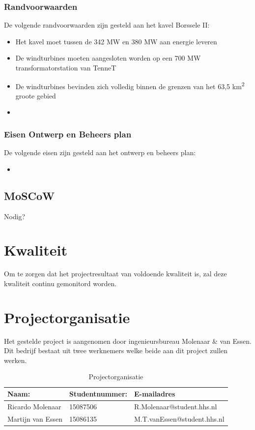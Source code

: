 \documentclass[numbers=endperiod]{scrartcl}
\begin{document}
	\subsubsection{Randvoorwaarden}
	De volgende randvoorwaarden zijn gesteld aan het kavel Borssele II:
	\begin{itemize}[noitemsep]
		\item Het kavel moet tussen de 342 MW en 380 MW aan energie leveren
		\item De windturbines moeten aangesloten worden op een 700 MW transformatorstation van TenneT
		\item De windturbines bevinden zich volledig binnen de grenzen van het 63,5 km\textsuperscript{2} groote gebied
		\item
	\end{itemize}
	\subsubsection{Eisen Ontwerp en Beheers plan}
	De volgende eisen zijn gesteld aan het ontwerp en beheers plan:
	\begin{itemize}
	\item
	\end{itemize}
	\subsection{MoSCoW}
	Nodig?
	
	\section{Kwaliteit}
	Om te zorgen dat het projectresultaat van voldoende kwaliteit is, zal deze kwaliteit continu gemonitord worden.
	\section{Projectorganisatie}
	Het gestelde project is aangenomen door ingenieursbureau Molenaar \& van Essen. Dit bedrijf bestaat uit
	twee werknemers welke beide aan dit project zullen werken. 
	\begin{table}[h]
	\caption{Projectorganisatie}\label{table:Projectorganisatie}
	
		\centering
		\begin{tabular}{ p{} | p{} | p{} }
			Naam: 				& Studentnummer:& E-mailadres \\ \hline
			Ricardo Molenaar 	& 15087506	 	& R.Molenaar@student.hhs.nl \\
			Martijn van Essen 	& 15086135		& M.T.vanEssen@student.hhs.nl \\
		\end{tabular}
	
	\end{table}
	\newpage
\end{document}
